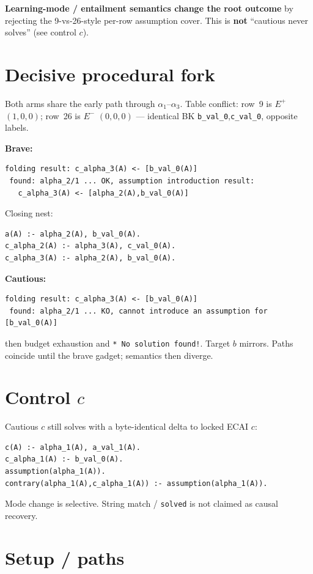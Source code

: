 \documentclass[11pt]{article}
\begin{document}
\textbf{Learning-mode / entailment semantics change the root outcome} by
rejecting the 9-vs-26-style per-row assumption cover.
This is \textbf{not} ``cautious never solves'' (see control \(c\)).

\section{Decisive procedural fork}

Both arms share the early path through \(\alpha_1\)--\(\alpha_3\).
Table conflict: row~9 is \(E^+\) \((1,0,0)\); row~26 is \(E^-\) \((0,0,0)\) ---
identical BK \texttt{b\_val\_0},\texttt{c\_val\_0}, opposite labels.

\textbf{Brave:}
\begin{verbatim}
folding result: c_alpha_3(A) <- [b_val_0(A)]
 found: alpha_2/1 ... OK, assumption introduction result:
   c_alpha_3(A) <- [alpha_2(A),b_val_0(A)]
\end{verbatim}
Closing nest:
\begin{verbatim}
a(A) :- alpha_2(A), b_val_0(A).
c_alpha_2(A) :- alpha_3(A), c_val_0(A).
c_alpha_3(A) :- alpha_2(A), b_val_0(A).
\end{verbatim}

\textbf{Cautious:}
\begin{verbatim}
folding result: c_alpha_3(A) <- [b_val_0(A)]
 found: alpha_2/1 ... KO, cannot introduce an assumption for [b_val_0(A)]
\end{verbatim}
then budget exhaustion and \texttt{* No solution found!}.
Target \(b\) mirrors.
Paths coincide until the brave gadget; semantics then diverge.

\section{Control \(c\)}

Cautious \(c\) still solves with a byte-identical delta to locked ECAI \(c\):
\begin{verbatim}
c(A) :- alpha_1(A), a_val_1(A).
c_alpha_1(A) :- b_val_0(A).
assumption(alpha_1(A)).
contrary(alpha_1(A),c_alpha_1(A)) :- assumption(alpha_1(A)).
\end{verbatim}
Mode change is selective.
String match / \texttt{solved} is not claimed as causal recovery.

\section{Setup / paths}
\end{document}
